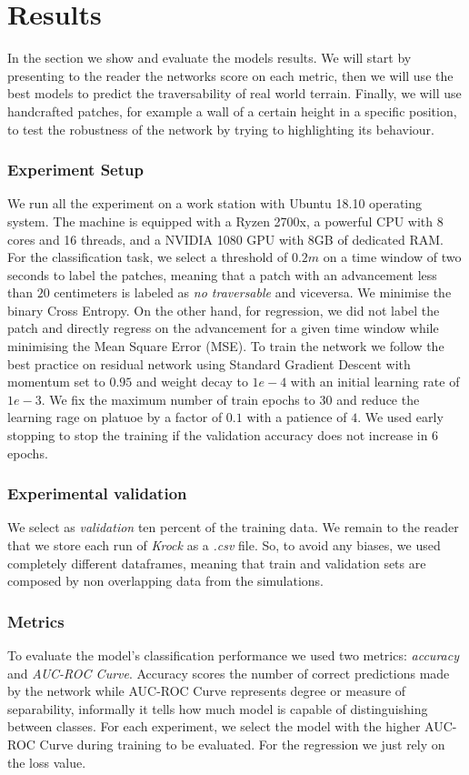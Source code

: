 \documentclass[../document.tex]{subfiles}
\begin{document}
\section{Results}
In the section we show and evaluate the models results. We will start by presenting to the reader the networks score on each metric, then we will use the best models to predict the traversability of real world terrain. Finally, we will use handcrafted patches, for example a wall of a certain height in a specific position, to test the robustness of the network by trying to highlighting its behaviour.
\subsubsection{Experiment Setup}
We run all the experiment on a work station with Ubuntu 18.10 operating system. The machine is equipped with a Ryzen 2700x, a powerful CPU with 8 cores and 16 threads, and a NVIDIA 1080 GPU with 8GB of dedicated RAM.
For the classification task, we select a threshold of $0.2m$ on a time window of two seconds to label the patches, meaning that a patch with an advancement less than $20$ centimeters is labeled as \emph{no traversable} and viceversa. We minimise the binary Cross Entropy.
On the other hand, for regression, we did not label the patch and directly regress on the advancement for a given time window while minimising the Mean Square Error (MSE). 
To train the network we follow the best practice on residual network \cite{he2015deep} using Standard Gradient Descent with momentum set to $0.95$ and weight decay to $1e-4$ with an initial learning rate of $1e-3$.
We fix the maximum number of train epochs to $30$ and reduce the learning rage on platuoe  by a factor of $0.1$ with a patience of $4$. We used early stopping to stop the training if the validation accuracy does not increase in $6$ epochs.
\subsubsection{Experimental validation}
We select as \emph{validation} ten percent of the training data. We remain to the reader that we store each run of \emph{Krock} as a \emph{.csv} file. So, to avoid any biases, we used completely different dataframes, meaning that train and validation sets are composed by non overlapping data from the simulations.
\subsubsection{Metrics}
To evaluate the model's classification performance we used two metrics: \emph{accuracy} and \emph{AUC-ROC Curve}. Accuracy scores the number of correct predictions made by the network while AUC-ROC Curve represents degree or measure of separability, informally it tells how much model is capable of distinguishing between classes. For each experiment, we select the model with the higher AUC-ROC Curve during training to be evaluated.
For the regression we just rely on the loss value.
\end{document}
